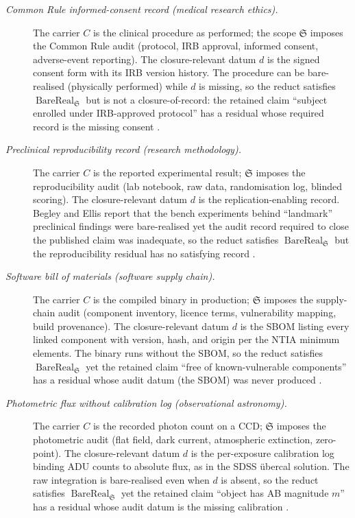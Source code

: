 \documentclass[11pt]{article}
\theoremstyle{definition}
\begin{document}
\begin{description}
\item[\emph{Common Rule informed-consent record
(medical research ethics).}]
The carrier \(C\) is the clinical procedure as
performed; the scope \(\mathfrak S\) imposes the
Common Rule audit (protocol, IRB approval,
informed consent, adverse-event reporting).  The
closure-relevant datum \(d\) is the signed
consent form with its IRB version history.  The
procedure can be bare-realised (physically
performed) while \(d\) is missing, so the reduct
satisfies \(\operatorname{BareReal}_{\mathfrak S}\)
but is not a closure-of-record: the retained
claim ``subject enrolled under IRB-approved
protocol'' has a residual whose required record
is the missing consent \citep{DHHS2018CommonRule}.

\item[\emph{Preclinical reproducibility record
(research methodology).}]
The carrier \(C\) is the reported experimental
result; \(\mathfrak S\) imposes the
reproducibility audit (lab notebook, raw data,
randomisation log, blinded scoring).  The
closure-relevant datum \(d\) is the
replication-enabling record.  Begley and Ellis
report that the bench experiments behind
``landmark'' preclinical findings were
bare-realised yet the audit record required to
close the published claim was inadequate, so the
reduct satisfies \(\operatorname{BareReal}
_{\mathfrak S}\) but the reproducibility
residual has no satisfying record
\citep{Begley2012Drug}.

\item[\emph{Software bill of materials (software
supply chain).}]
The carrier \(C\) is the compiled binary in
production; \(\mathfrak S\) imposes the
supply-chain audit (component inventory, licence
terms, vulnerability mapping, build provenance).
The closure-relevant datum \(d\) is the SBOM
listing every linked component with version,
hash, and origin per the NTIA minimum elements.
The binary runs without the SBOM, so the reduct
satisfies \(\operatorname{BareReal}_{\mathfrak S}\)
yet the retained claim ``free of
known-vulnerable components'' has a residual
whose audit datum (the SBOM) was never produced
\citep{NTIA2021SBOM}.

\item[\emph{Photometric flux without calibration
log (observational astronomy).}]
The carrier \(C\) is the recorded photon count on
a CCD; \(\mathfrak S\) imposes the photometric
audit (flat field, dark current, atmospheric
extinction, zero-point).  The closure-relevant
datum \(d\) is the per-exposure calibration log
binding ADU counts to absolute flux, as in the
SDSS \"ubercal solution.  The raw integration is
bare-realised even when \(d\) is absent, so the
reduct satisfies \(\operatorname{BareReal}
_{\mathfrak S}\) yet the retained claim ``object
has AB magnitude \(m\)'' has a residual whose
audit datum is the missing calibration
\citep{Padmanabhan2008Improved}.


\end{description}
\end{document}
